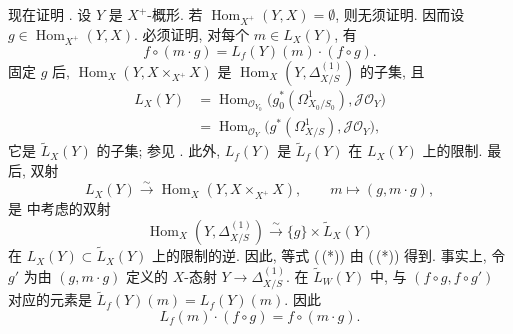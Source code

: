 现在证明 .
设 \(Y\) 是 \(X^+\)-概形. 若
\(\operatorname{Hom}_{X^+}(Y,X)=\emptyset\), 则无须证明.
因而设 \(g\in\operatorname{Hom}_{X^+}(Y,X)\). 必须证明,
对每个 \(m\in L_X(Y)\), 有
\begin{equation}
 f\circ(m\cdot g)=L_f(Y)(m)\cdot(f\circ g).
 \tag{0.1.10\,(*)}\label{sga3:iii:corollary:0-1-10:equation:0-1-10-star}
\end{equation}
固定 \(g\) 后, \(\operatorname{Hom}_X(Y,X\times_{X^+}X)\)
是 \(\operatorname{Hom}_X(Y,\Delta^{(1)}_{X/S})\) 的子集, 且
\[
\begin{aligned}
 L_X(Y)
 &=\operatorname{Hom}_{\mathscr O_{Y_0}}
   \bigl(g_0^*(\Omega^1_{X_0/S_0}),\mathscr J\mathscr O_Y\bigr)\\
 &=\operatorname{Hom}_{\mathscr O_Y}
   \bigl(g^*(\Omega^1_{X/S}),\mathscr J\mathscr O_Y\bigr),
\end{aligned}
\]
它是 \(\widetilde L_X(Y)\) 的子集; 参见
. 此外, \(L_f(Y)\)
是 \(\widetilde L_f(Y)\) 在 \(L_X(Y)\) 上的限制.
最后, 双射
\[
 L_X(Y)\xrightarrow{\sim}
 \operatorname{Hom}_X(Y,X\times_{X^+}X),
 \qquad
 m\longmapsto(g,m\cdot g),
\]
是  中考虑的双射
\[
 \operatorname{Hom}_X(Y,\Delta^{(1)}_{X/S})
 \xrightarrow{\sim}\{g\}\times\widetilde L_X(Y)
\]
在 \(L_X(Y)\subset\widetilde L_X(Y)\) 上的限制的逆.
因此, 等式 (\,(*))
由 (\,(*)) 得到.
事实上, 令 \(g'\) 为由 \((g,m\cdot g)\) 定义的 \(X\)-态射
\(Y\to\Delta^{(1)}_{X/S}\). 在 \(\widetilde L_W(Y)\) 中,
与 \((f\circ g,f\circ g')\) 对应的元素是
\(\widetilde L_f(Y)(m)=L_f(Y)(m)\). 因此
\[
 L_f(m)\cdot(f\circ g)=f\circ(m\cdot g).
\]

